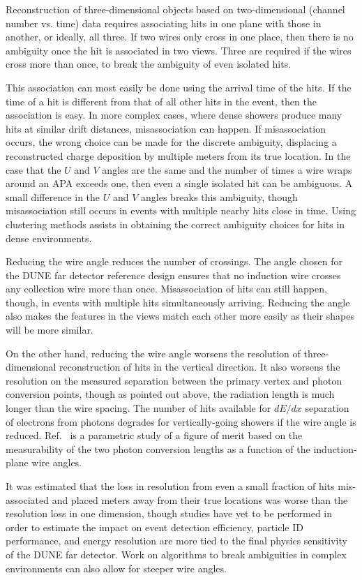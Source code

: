 Reconstruction of three-dimensional objects based on two-dimensional (channel number vs. time)
data requires associating hits in one plane with those in another, or ideally, all three.
If two wires only cross in one place, then there is no ambiguity once the hit is associated
in two views.  Three are required if the wires cross more than once, to break the ambiguity
of even isolated hits.

This association can most easily be done using the arrival time of the hits.  If the time of
a hit is different from that of all other hits in the event, then the association is easy.
In more complex cases, where dense showers produce many hits at similar drift distances,
misassociation can happen.  If misassociation occurs, the wrong choice can be made for
the discrete ambiguity, displacing a reconstructed charge deposition
by multiple meters from its true location.  In the case that the $U$ and $V$ angles are the
same and the number of times a wire wraps around an APA exceeds one, then even a single isolated
hit can be ambiguous.  A small difference in the $U$ and $V$ angles breaks this ambiguity,
though misassociation still occurs in events with multiple nearby hits close in time.
Using clustering methods assists in obtaining the correct ambiguity choices for hits in
dense environments.

Reducing the wire angle reduces the number of crossings.  The angle chosen for the DUNE
far detector reference design ensures that no induction wire crosses any collection wire
more than once.  Misassociation of hits can still happen, though, in events with multiple
hits simultaneously arriving.  Reducing the angle also makes the features in the views
match each other more easily as their shapes will be more similar.

On the other hand, reducing the wire angle worsens the resolution of three-dimensional
reconstruction of hits in the vertical direction.  It also worsens the resolution on the
measured separation between the primary vertex and photon conversion points, though as pointed
out above, the radiation length is much longer than the wire spacing.  The number of hits
available for $dE/dx$ separation of electrons from photons degrades for vertically-going
showers if the wire angle is reduced.  Ref.~\cite{wire-orientation} is a parametric
study of a figure of merit based on the measurability of the two photon conversion
lengths as a function of the induction-plane wire angles.

It was estimated that the loss in resolution from even a small fraction
of hits mis-associated and placed meters away from their true
locations was worse than the resolution loss in one
dimension\cite{docdb-8981}, though studies have yet to be performed
in order to estimate the impact on event detection efficiency,
particle ID performance, and energy resolution are more tied to the
final physics sensitivity of the DUNE far detector.  Work on
algorithms to break ambiguities in complex environments can also allow
for steeper wire angles.

